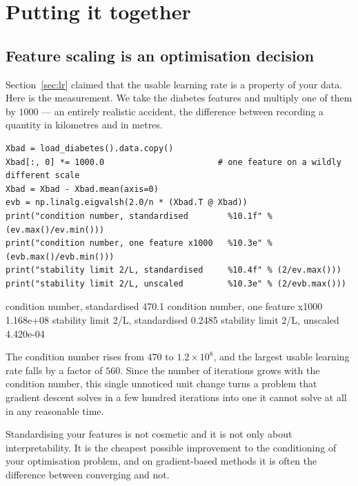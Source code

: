 \documentclass[11pt]{article}
\begin{document}
\section{Putting it together}
\label{sec:practice}

\subsection{Feature scaling is an optimisation decision}
\label{sec:scaling}

Section~\ref{sec:lr} claimed that the usable learning rate is a property of
your data. Here is the measurement. We take the diabetes features and multiply
one of them by $1000$ --- an entirely realistic accident, the difference
between recording a quantity in kilometres and in metres.

\begin{lstlisting}
Xbad = load_diabetes().data.copy()
Xbad[:, 0] *= 1000.0                       # one feature on a wildly different scale
Xbad = Xbad - Xbad.mean(axis=0)
evb = np.linalg.eigvalsh(2.0/n * (Xbad.T @ Xbad))
print("condition number, standardised        %10.1f" % (ev.max()/ev.min()))
print("condition number, one feature x1000   %10.3e" % (evb.max()/evb.min()))
print("stability limit 2/L, standardised     %10.4f" % (2/ev.max()))
print("stability limit 2/L, unscaled         %10.3e" % (2/evb.max()))
\end{lstlisting}
\begin{codeout}
condition number, standardised             470.1
condition number, one feature x1000   1.168e+08
stability limit 2/L, standardised         0.2485
stability limit 2/L, unscaled          4.420e-04
\end{codeout}

The condition number rises from $470$ to $1.2 \times 10^8$, and the largest
usable learning rate falls by a factor of $560$. Since the number of iterations
grows with the condition number, this single unnoticed unit change turns a
problem that gradient descent solves in a few hundred iterations into one it
cannot solve at all in any reasonable time.

\begin{keyidea}
Standardising your features is not cosmetic and it is not only about
interpretability. It is the cheapest possible improvement to the conditioning
of your optimisation problem, and on gradient-based methods it is often the
difference between converging and not.
\end{keyidea}
\end{document}
